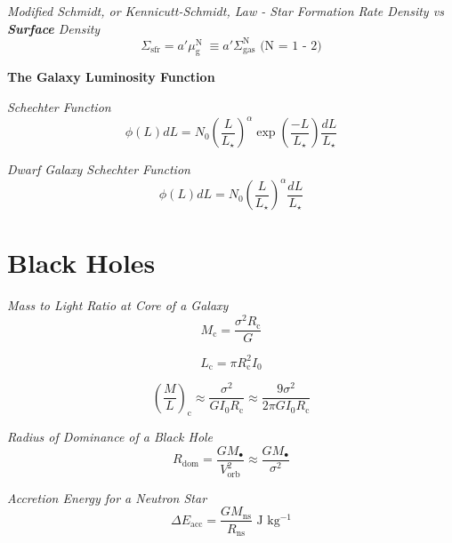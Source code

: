 \documentclass{article}
\begin{document}
\textit {Modified Schmidt, or Kennicutt-Schmidt, Law - Star Formation Rate Density vs \textbf{Surface} Density}
\begin{equation}
\Sigma_\mathrm{sfr} = a' \mu^\mathrm{N}_\mathrm{g} \; \equiv a' \Sigma^\mathrm{N}_\mathrm{gas} \text{ (N = 1 - 2)}
\end{equation}

\textbf {The Galaxy Luminosity Function}


\textit {Schechter Function}
\begin{equation}
\phi(L) dL = N_\mathrm{0} \left( \frac {L}{L_\star} \right)^\alpha \exp \left( \frac {-L}{L_\star} \right) \frac {dL}{L_\star}
\end{equation}

\textit {Dwarf Galaxy Schechter Function}
\begin{equation}
\phi(L) dL = N_\mathrm{0} \left( \frac {L}{L_\star} \right)^\alpha \frac {dL}{L_\star}
\end{equation}



\newpage

\section{Black Holes}

\textit{Mass to Light Ratio at Core of a Galaxy}
\begin{equation}
M_\mathrm{c} = \frac{\sigma^2 R_\mathrm{c}}{G}
\end{equation}

\begin{equation}
L_\mathrm{c} = \pi R^2_\mathrm{c} I_\mathrm{0}
\end{equation}

\begin{equation}
\left(\frac{M}{L} \right)_\mathrm{c} \approx \frac{\sigma^2}{G I_\mathrm{0} R_\mathrm{c}}  \approx \frac{9\sigma^2}{2 \pi G I_\mathrm{0} R_\mathrm{c}}
\end{equation}

\textit{Radius of Dominance of a Black Hole}
\begin{equation}
R_\mathrm{dom} = \frac{G M_\bullet}{V^2_\mathrm{orb}} \approx \frac{G M_\bullet}{\sigma^2}
\end{equation}

\textit{Accretion Energy for a Neutron Star}
\begin{equation}
\Delta E_\mathrm{acc}  = \frac{G M_\mathrm{ns}}{R_\mathrm{ns}} \text{  J kg\(^{-1}\)}
\end{equation}
\end{document}
